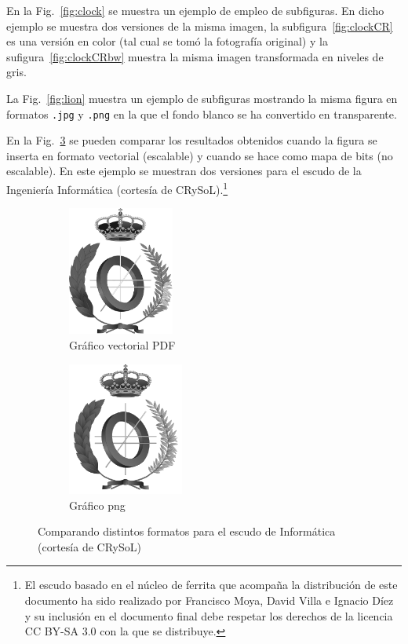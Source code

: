 \documentclass[11pt,a4paper]{article}
\begin{document}
En la Fig.~\ref{fig:clock} se muestra un ejemplo de empleo de subfiguras. En dicho ejemplo se muestra dos versiones de la misma imagen, la subfigura~\ref{fig:clockCR} es una versión en color (tal cual se tomó la fotografía original) y la sufigura~\ref{fig:clockCRbw} muestra la misma imagen transformada en niveles de gris.

La Fig.~\ref{fig:lion} muestra un ejemplo de subfiguras mostrando la misma figura en formatos \texttt{.jpg} y \texttt{.png} en la que el fondo blanco se ha convertido en transparente. 

En la Fig.~\ref{fig:escudo} se pueden comparar los resultados obtenidos cuando la figura se inserta en formato vectorial (escalable) y cuando se hace como mapa de bits (no escalable). En este ejemplo se muestran dos versiones para el escudo de la Ingeniería Informática (cortesía de CRySoL).\footnote{El escudo basado en el núcleo de ferrita que acompaña la distribución de este documento ha sido realizado por Francisco Moya, David Villa e Ignacio Díez y su inclusión en el documento final debe respetar los derechos de la licencia CC BY-SA 3.0 con la que se distribuye.}


\begin{figure}[htb]
	\centering
	\begin{subfigure}[b]{0.4\linewidth}
		\centering
		\includegraphics[width=3.5cm]{escudoInfBW.pdf}
		\caption{Gráfico vectorial PDF}\label{fig:escudoPDF}
	\end{subfigure}
	\begin{subfigure}[b]{0.4\linewidth}
		\centering
		\includegraphics[width=3.8cm]{escudoInfBW.png}
		\caption{Gráfico png}\label{fig:escudoPNG}
	\end{subfigure}
	\caption[Comparación PDF y png]{Comparando distintos formatos para el escudo de Informática (cortesía de CRySoL)}
	\label{fig:escudo}
\end{figure}
\end{document}
